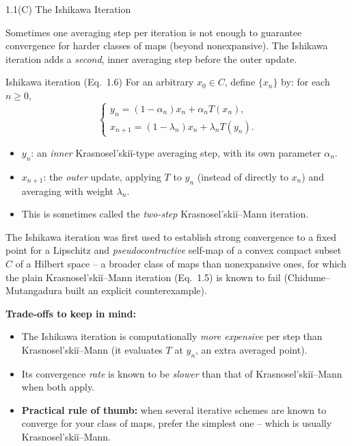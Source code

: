 \documentclass[aspectratio=169,10pt]{beamer}
\begin{document}
\begin{frame}[allowframebreaks]{1.1(C) The Ishikawa Iteration}

Sometimes one averaging step per iteration is not enough to guarantee
convergence for harder classes of maps (beyond nonexpansive). The
Ishikawa iteration adds a \emph{second}, inner averaging step before the
outer update.

\begin{block}{Ishikawa iteration (Eq.\ 1.6)}
For an arbitrary $x_0\in C$, define $\{x_n\}$ by: for each $n\ge 0$,
\[
  \begin{cases}
    y_n = (1-\alpha_n)x_n + \alpha_n T(x_n),\\
    x_{n+1} = (1-\lambda_n)x_n + \lambda_n T(y_n).
  \end{cases}
\]
\begin{itemize}
  \item $y_n$: an \emph{inner} Krasnosel'ski\u{i}-type averaging step,
    with its own parameter $\alpha_n$.
  \item $x_{n+1}$: the \emph{outer} update, applying $T$ to $y_n$ (instead
    of directly to $x_n$) and averaging with weight $\lambda_n$.
  \item This is sometimes called the \emph{two-step} Krasnosel'ski\u{i}--Mann
    iteration.
\end{itemize}
\end{block}

The Ishikawa iteration was first used to establish strong convergence to a
fixed point for a Lipschitz and \emph{pseudocontractive} self-map of a
convex compact subset $C$ of a Hilbert space -- a broader class of maps
than nonexpansive ones, for which the plain Krasnosel'ski\u{i}--Mann
iteration (Eq.\ 1.5) is known to fail (Chidume--Mutangadura built an
explicit counterexample).

\framebreak

\textbf{Trade-offs to keep in mind:}
\begin{itemize}
  \item The Ishikawa iteration is computationally \emph{more expensive}
    per step than Krasnosel'ski\u{i}--Mann (it evaluates $T$ at $y_n$, an
    extra averaged point).
  \item Its convergence \emph{rate} is known to be \emph{slower} than that
    of Krasnosel'ski\u{i}--Mann when both apply.
  \item \textbf{Practical rule of thumb:} when several iterative schemes
    are known to converge for your class of maps, prefer the simplest
    one -- which is usually Krasnosel'ski\u{i}--Mann.
\end{itemize}

\end{frame}
\end{document}
